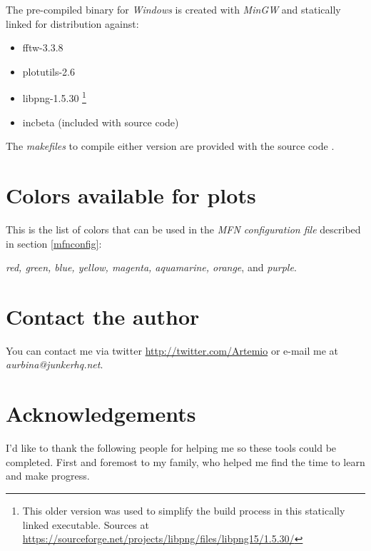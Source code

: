 \documentclass[10pt,a4paper]{report}
\begin{document}
\begin{appendices}
The pre-compiled binary for \textit{Windows} is created with \textit{MinGW}\cite{mingw} and statically linked for distribution against:

\begin{itemize}
	\item fftw-3.3.8 \cite{fftw}
	\item plotutils-2.6 \cite{libplot}
	\item libpng-1.5.30 \footnote{This older version was used to simplify the build process in this statically linked executable. Sources at \url{https://sourceforge.net/projects/libpng/files/libpng15/1.5.30/}}
	\item incbeta \cite{betafunction} (included with source code)
\end{itemize}

The \textit{makefiles} to compile either version are provided with the source code \cite{sourcecode}.

\chapter{Colors available for plots}
\label{availablecolors}

This is the list of colors that can be used in the \textit{MFN configuration file} described in section \ref{mfnconfig}: 

\textit{red, green, blue, yellow, magenta, aquamarine, orange}, and \textit{purple}.

\chapter{Contact the author}
\label{contact}

You can contact me via twitter \url{http://twitter.com/Artemio} or e-mail me at \textit{aurbina@junkerhq.net}.

\chapter{Acknowledgements}

I'd like to thank the following people for helping me so these tools could be completed. First and foremost to my family, who helped me find the time to learn and make progress.

\end{appendices}
\end{document}
